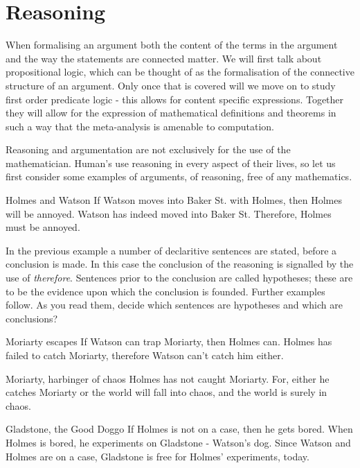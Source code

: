 \documentclass{book}
\begin{document}
\section{Reasoning}

When formalising an argument both the content of the terms in the argument and the way the statements are connected matter. We will first talk about propositional logic, which can be thought of as the formalisation of the connective structure of an argument. Only once that is covered will we move on to study first order predicate logic - this allows for content specific expressions. Together they will allow for the expression of mathematical definitions and theorems in such a way that the meta-analysis is amenable to computation. 

Reasoning and argumentation are not exclusively for the use of the mathematician. Human's use reasoning in every aspect of their lives, so let us first consider some examples of arguments, of reasoning, free of any mathematics. 

\begin{eg}{Holmes and Watson}
    If Watson moves into Baker St. with Holmes, then Holmes will be annoyed. Watson has indeed moved into Baker St. Therefore, Holmes must be annoyed.     
\end{eg}

In the previous example a number of declaritive sentences are stated, before a conclusion is made. In this case the conclusion of the reasoning is signalled by the use of \emph{therefore}. Sentences prior to the conclusion are called hypotheses; these are to be the evidence upon which the conclusion is founded. Further examples follow. As you read them, decide which sentences are hypotheses and which are conclusions? 

\begin{eg}{Moriarty escapes}
    If Watson can trap Moriarty, then Holmes can. Holmes has failed to catch Moriarty, therefore Watson can't catch him either. 
\end{eg}

\begin{eg}{Moriarty, harbinger of chaos}
    Holmes has not caught Moriarty. For, either he catches Moriarty or the world will fall into chaos, and the world is surely in chaos. 
\end{eg}

\begin{eg}{Gladstone, the Good Doggo}
    If Holmes is not on a case, then he gets bored. When Holmes is bored, he experiments on Gladstone - Watson's dog. Since Watson and Holmes are on a case, Gladstone is free for Holmes' experiments, today. 
\end{eg}
\end{document}
